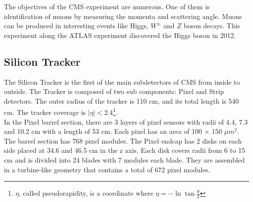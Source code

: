  The objectives of the CMS experiment are numerous. One of them is
identification of muons by measuring the momenta and scattering angle. Muons can be produced in interesting events like Higgs, $W^{\pm}$ and $Z$ boson decays.%
This experiment along the ATLAS experiment discovered the Higgs boson in 2012.
\\


\subsection{Silicon Tracker}
The Silicon Tracker is the first of the main subdetectors of CMS from inside to outside. The Tracker is composed of two sub components: Pixel and Strip detectors. The outer radius of the tracker is 110 cm, and its total length is 540 cm. The tracker coverage is $|\eta|<2.4$\footnote{$\eta$, called pseudorapidity, is a coordinate where $\eta=-\ln{\tan{\frac{\theta}{2}}}$}.\\

In the Pixel barrel section, there are 3 layers of pixel sensors with radii of 4.4, 7.3 and 10.2 cm with a length of 53 cm. Each pixel has an area of 100 $\times$ 150 $\mu m^2$. The barrel section has 768 pixel modules.
The Pixel endcap has 2 disks on each side placed at 34.6 and 46.5 cm in the z axis. Each disk covers radii from 6 to 15 cm and is divided into 24 blades with 7 modules each blade.
They are assembled in a turbine-like geometry that contains a total of 672 pixel modules. %
\\

